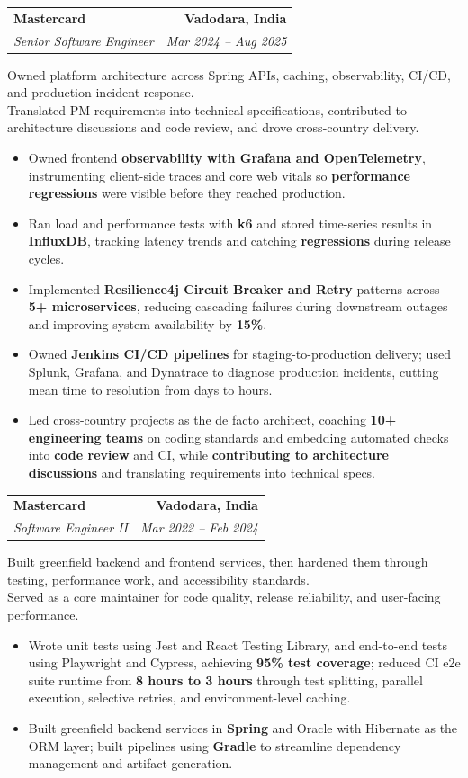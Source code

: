 \documentclass[letterpaper,11pt]{article}
\makeatletter
\newcommand{\resumeItem}[1]{
  \item\small{
    {#1 \vspace{-3pt}}
  }
}
\newcommand{\resumeSubheading}[4]{
  \vspace{-3pt}\item
    \begin{tabular*}{1.0\textwidth}[t]{l@{\extracolsep{\fill}}r}
      \textbf{#1} & \textbf{\small #2} \\
      \textit{\small#3} & \textit{\small #4} \\
    \end{tabular*}\vspace{-2pt}
}
\newcommand{\resumeRoleSummary}[1]{
  {\small #1\par}
  \vspace{-2pt}
}
\newcommand{\resumeItemListStart}{\begin{itemize}}
\newcommand{\resumeItemListEnd}{\end{itemize}\vspace{0pt}}
\makeatother
\begin{document}
    \resumeSubheading
      {Mastercard}{Vadodara, India}
      {Senior Software Engineer}{Mar 2024 -- Aug 2025}
      \resumeRoleSummary{Owned platform architecture across Spring APIs, caching, observability, CI/CD, and production incident response.\\
      Translated PM requirements into technical specifications, contributed to architecture discussions and code review, and drove cross-country delivery.}
      \resumeItemListStart
        \resumeItem{Owned frontend \textbf{observability with Grafana and OpenTelemetry}, instrumenting client-side traces and core web vitals so \textbf{performance regressions} were visible before they reached production.}
        \resumeItem{Ran load and performance tests with \textbf{k6} and stored time-series results in \textbf{InfluxDB}, tracking latency trends and catching \textbf{regressions} during release cycles.}
        \resumeItem{Implemented \textbf{Resilience4j Circuit Breaker and Retry} patterns across \textbf{5+ microservices}, reducing cascading failures during downstream outages and improving system availability by \textbf{15\%}.}
        \resumeItem{Owned \textbf{Jenkins CI/CD pipelines} for staging-to-production delivery; used Splunk, Grafana, and Dynatrace to diagnose production incidents, cutting mean time to resolution from days to hours.}
        \resumeItem{Led cross-country projects as the de facto architect, coaching \textbf{10+ engineering teams} on coding standards and embedding automated checks into \textbf{code review} and CI, while \textbf{contributing to architecture discussions} and translating requirements into technical specs.}
      \resumeItemListEnd

    \resumeSubheading
      {Mastercard}{Vadodara, India}
      {Software Engineer II}{Mar 2022 -- Feb 2024}
      \resumeRoleSummary{Built greenfield backend and frontend services, then hardened them through testing, performance work, and accessibility standards.\\
      Served as a core maintainer for code quality, release reliability, and user-facing performance.}
      \resumeItemListStart
        \resumeItem{Wrote unit tests using Jest and React Testing Library, and end-to-end tests using Playwright and Cypress, achieving \textbf{95\% test coverage}; reduced CI e2e suite runtime from \textbf{8 hours to 3 hours} through test splitting, parallel execution, selective retries, and environment-level caching.}
        \resumeItem{Built greenfield backend services in \textbf{Spring} and Oracle with Hibernate as the ORM layer; built pipelines using \textbf{Gradle} to streamline dependency management and artifact generation.}
      \resumeItemListEnd
\end{document}
